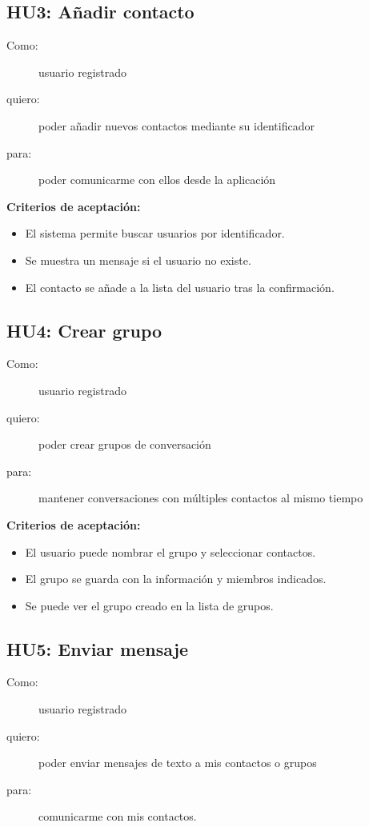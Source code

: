\subsection*{HU3: Añadir contacto}
\begin{description}
  \item[Como:] usuario registrado
  \item[quiero:] poder añadir nuevos contactos mediante su identificador
  \item[para:] poder comunicarme con ellos desde la aplicación
\end{description}

\textbf{Criterios de aceptación:}
\begin{itemize}
    \item El sistema permite buscar usuarios por identificador.
    \item Se muestra un mensaje si el usuario no existe.
    \item El contacto se añade a la lista del usuario tras la confirmación.
\end{itemize}

\subsection*{HU4: Crear grupo}
\begin{description}
  \item[Como:] usuario registrado
  \item[quiero:] poder crear grupos de conversación
  \item[para:] mantener conversaciones con múltiples contactos al mismo tiempo
\end{description}

\textbf{Criterios de aceptación:}
\begin{itemize}
    \item El usuario puede nombrar el grupo y seleccionar contactos.
    \item El grupo se guarda con la información y miembros indicados.
    \item Se puede ver el grupo creado en la lista de grupos.
\end{itemize}

\subsection*{HU5: Enviar mensaje}
\begin{description}
  \item[Como:] usuario registrado
  \item[quiero:] poder enviar mensajes de texto a mis contactos o grupos
  \item[para:] comunicarme con mis contactos.
\end{description}

